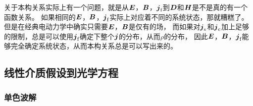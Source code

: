 关于本构关系实际上有一个问题，就是从$\vb*{E}$，$\vb*{B}$，$\vb*{j}_\text{f}$到$\vb*{D}$和$\vb*{H}$是不是真的有一个函数关系。
如果相同的$\vb*{E}$，$\vb*{B}$，$\vb*{j}_\text{f}$实际上对应着不同的系统状态，那就糟糕了。
但是在经典电动力学中确实只需要$\vb*{E}$，$\vb*{B}$是仅有的场，
而如果对$\vb*{j}_\text{s}$和$\vb*{j}_\text{c}$加上足够的限制，总是可以使用$\vb*{j}_\text{f}$确定下整个$\vb*{j}$的分布，从而$\rho$的分布，
因此$\vb*{E}$，$\vb*{B}$，$\vb*{j}_\text{f}$能够完全确定系统状态，从而本构关系总是可以写出来的。

\subsection{线性介质假设到光学方程}

\subsubsection{单色波解}

